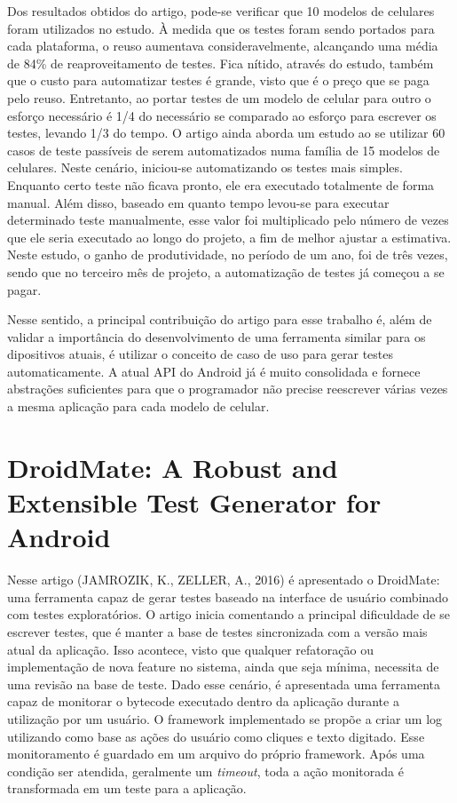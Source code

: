 \documentclass[
    12pt,       %
    openright,      %
    twoside,      %
    a4paper,      %
    english,      %
    french,       %
    spanish,      %
    brazil,       %
    ]{abntex2}
\begin{document}
      Dos resultados obtidos do artigo, pode-se verificar que 10 modelos de celulares foram utilizados no
      estudo. À medida que os testes foram sendo portados para cada plataforma, o reuso aumentava
      consideravelmente, alcançando uma média de 84\% de reaproveitamento de testes. Fica nítido, através
      do estudo, também que o custo para automatizar testes é grande, visto que é o preço que se paga pelo
      reuso. Entretanto, ao portar testes de um modelo de celular para outro o esforço necessário é 1/4 do
      necessário se comparado ao esforço para escrever os testes, levando 1/3 do tempo. O artigo ainda
      aborda um estudo ao se utilizar 60 casos de teste passíveis de serem automatizados numa família de 15
      modelos de celulares. Neste cenário, iniciou-se automatizando os testes mais simples. Enquanto certo
      teste não ficava pronto, ele era executado totalmente de forma manual. Além disso, baseado em quanto
      tempo levou-se para executar determinado teste manualmente, esse valor foi multiplicado pelo número de
      vezes que ele seria executado ao longo do projeto, a fim de melhor ajustar a estimativa. Neste estudo,
      o ganho de produtividade, no período de um ano, foi de três vezes, sendo que no terceiro mês de projeto,
      a automatização de testes já começou a se pagar.

      Nesse sentido, a principal contribuição do artigo para esse trabalho é, além de validar a importância
      do desenvolvimento de uma ferramenta similar para os dipositivos atuais, é utilizar o conceito de caso
      de uso para gerar testes automaticamente. A atual API do Android já é muito consolidada e fornece
      abstrações suficientes para que o programador não precise reescrever várias vezes a mesma aplicação
      para cada modelo de celular.

    \section{DroidMate: A Robust and Extensible Test Generator for Android}
      Nesse artigo (JAMROZIK, K., ZELLER, A., 2016) é apresentado o DroidMate: uma ferramenta
      capaz de gerar testes baseado na interface de usuário combinado com testes
      exploratórios. O artigo inicia comentando a principal dificuldade de se escrever
      testes, que é manter a base de testes sincronizada com a versão mais atual da aplicação.
      Isso acontece, visto que qualquer refatoração ou implementação de nova feature no sistema,
      ainda que seja mínima, necessita de uma revisão na base de teste. Dado esse cenário,
      é apresentada uma ferramenta capaz de monitorar o bytecode executado dentro da aplicação
      durante a utilização por um usuário. O framework implementado se propõe a criar
      um log utilizando como base as ações do usuário como cliques e texto
      digitado. Esse monitoramento é guardado em um arquivo do próprio framework. Após
      uma condição ser atendida, geralmente um \textit{timeout}, toda a ação monitorada
      é transformada em um teste para a aplicação.
\end{document}

